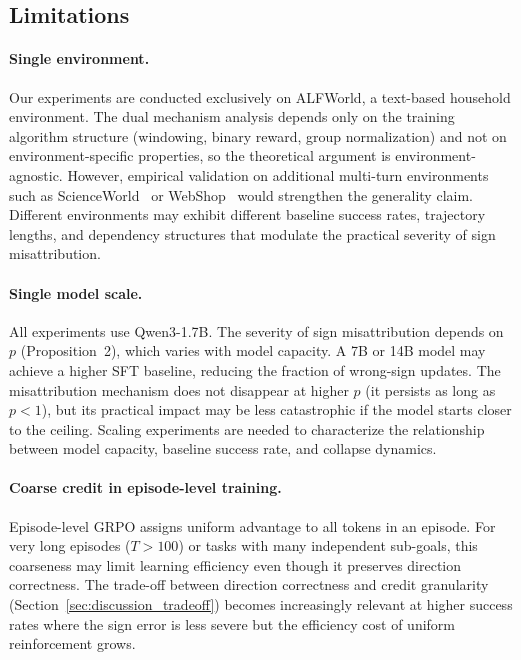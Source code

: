 \subsection{Limitations}
\label{sec:limitations}

\paragraph{Single environment.} Our experiments are conducted exclusively on ALFWorld, a text-based household environment. The dual mechanism analysis depends only on the training algorithm structure (windowing, binary reward, group normalization) and not on environment-specific properties, so the theoretical argument is environment-agnostic. However, empirical validation on additional multi-turn environments such as ScienceWorld~\cite{wang2022scienceworld} or WebShop~\cite{yao2022webshop} would strengthen the generality claim. Different environments may exhibit different baseline success rates, trajectory lengths, and dependency structures that modulate the practical severity of sign misattribution.

\paragraph{Single model scale.} All experiments use Qwen3-1.7B. The severity of sign misattribution depends on $p$ (Proposition~2), which varies with model capacity. A 7B or 14B model may achieve a higher SFT baseline, reducing the fraction of wrong-sign updates. The misattribution mechanism does not disappear at higher $p$ (it persists as long as $p < 1$), but its practical impact may be less catastrophic if the model starts closer to the ceiling. Scaling experiments are needed to characterize the relationship between model capacity, baseline success rate, and collapse dynamics.

\paragraph{Coarse credit in episode-level training.} Episode-level GRPO assigns uniform advantage to all tokens in an episode. For very long episodes ($T > 100$) or tasks with many independent sub-goals, this coarseness may limit learning efficiency even though it preserves direction correctness. The trade-off between direction correctness and credit granularity (Section~\ref{sec:discussion_tradeoff}) becomes increasingly relevant at higher success rates where the sign error is less severe but the efficiency cost of uniform reinforcement grows.

